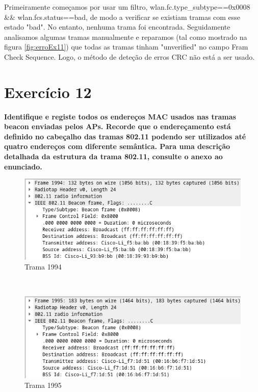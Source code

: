 \documentclass[a4paper]{report}
\begin{document}
Primeiramente começamos por usar um filtro, wlan.fc.type_subtype==0x0008 &&
wlan.fcs.status==bad, de modo a verificar se existiam tramas com esse estado
"bad". No entanto, nenhuma trama foi encontrada. Seguidamente analisamos algumas
tramas manualmente e reparamos (tal como mostrado na figura \ref{fig:erroEx11})
que todas as tramas tinham "unverified" no campo Fram Check Sequence. Logo, o
método de deteção de erros CRC não está a ser usado.

\section{Exercício 12}
\textbf{Identifique e registe todos os endereços MAC usados nas tramas beacon
    enviadas pelos APs. Recorde que o endereçamento está definido no cabeçalho
    das tramas 802.11 podendo ser utilizados até quatro endereços com diferente
    semântica. Para uma descrição detalhada da estrutura da trama 802.11,
    consulte o anexo ao enunciado.}\\

\begin{figure}[H]
    \centering 
    \includegraphics[width=\textwidth]{images/trama1994Ex12.png}  
    \caption{Trama 1994}
    \label{fig:trama1994Ex12}
\end{figure}\\

\begin{figure}[H]
    \centering
    \includegraphics[width=\textwidth]{images/trama1995Ex12.png}  
    \caption{Trama 1995}
    \label{fig:trama1995Ex12}
\end{figure}\\
\end{document}
